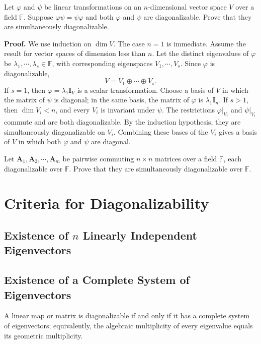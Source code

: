 \documentclass[12pt, a4paper, oneside]{book}
\begin{document}
\begin{theorem}
    Let $\varphi$ and $\psi$ be linear transformations on an $n$-dimensional vector space $V$ over a field $\mathbb{F}$. Suppose $\varphi \psi=\psi \varphi$ and both $\varphi$ and $\psi$ are diagonalizable. Prove that they are simultaneously diagonalizable.

    \textbf{Proof.}
    We use induction on $\dim V$. The case $n=1$ is immediate. Assume the result for vector spaces of dimension less than $n$. Let the distinct eigenvalues of $\varphi$ be $\lambda_1, \cdots, \lambda_s \in \mathbb{F}$, with corresponding eigenspaces $V_1, \cdots, V_s$. Since $\varphi$ is diagonalizable,
    \[
        V=V_1 \oplus \cdots \oplus V_s .
    \]
    If $s=1$, then ${\varphi}=\lambda_1 \mathbf{I}_V$ is a scalar transformation. Choose a basis of $V$ in which the matrix of ${\psi}$ is diagonal; in the same basis, the matrix of ${\varphi}$ is $\lambda_1 \mathbf{I}_n$. If $s>1$, then $\operatorname{dim} V_i<n$, and every $V_i$ is invariant under $\psi$. The restrictions $\left.\varphi\right|_{V_i}$ and $\left.\psi\right|_{V_i}$ commute and are both diagonalizable. By the induction hypothesis, they are simultaneously diagonalizable on $V_i$. Combining these bases of the $V_i$ gives a basis of $V$ in which both $\varphi$ and $\psi$ are diagonal.
\end{theorem}
\begin{theorem}
    Let $\mathbf{A}_1, \mathbf{A}_2, \cdots, \mathbf{A}_m$ be pairwise commuting $n \times n$ matrices over a field $\mathbb{F}$, each diagonalizable over $\mathbb{F}$. Prove that they are simultaneously diagonalizable over $\mathbb{F}$.
\end{theorem}



\section{Criteria for Diagonalizability}
\subsection{Existence of $n$ Linearly Independent Eigenvectors}
\subsection{Existence of a Complete System of Eigenvectors}
A linear map or matrix is diagonalizable if and only if it has a complete system of eigenvectors; equivalently, the algebraic multiplicity of every eigenvalue equals its geometric multiplicity.
\end{document}
